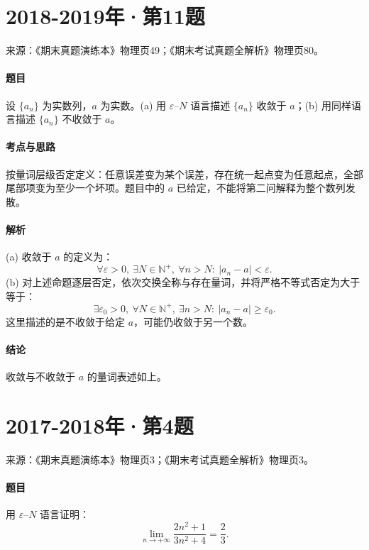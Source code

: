 \documentclass[UTF8,fontset=fandol,12pt,oneside,openany]{ctexrep}
\theoremstyle{definition}
\begin{document}
\par\addvspace{18pt}\noindent\begin{minipage}{\linewidth}
\section{2018-2019年·第11题}
\noindent 来源：《期末真题演练本》物理页49；《期末考试真题全解析》物理页80。

\paragraph{题目}
设 $\{a_n\}$ 为实数列，$a$ 为实数。(a) 用 $\varepsilon$–$N$ 语言描述 $\{a_n\}$ 收敛于 $a$；(b) 用同样语言描述 $\{a_n\}$ 不收敛于 $a$。
\end{minipage}\par
\paragraph{考点与思路}
按量词层级否定定义：任意误差变为某个误差，存在统一起点变为任意起点，全部尾部项变为至少一个坏项。题目中的 $a$ 已给定，不能将第二问解释为整个数列发散。

\paragraph{解析}
(a) 收敛于 $a$ 的定义为：
\[
\forall\varepsilon>0,\ \exists N\in\mathbb N^+,\ \forall n>N:\ |a_n-a|<\varepsilon.
\]
(b) 对上述命题逐层否定，依次交换全称与存在量词，并将严格不等式否定为大于等于：
\[
\exists\varepsilon_0>0,\ \forall N\in\mathbb N^+,\ \exists n>N:\ |a_n-a|\ge\varepsilon_0.
\]
这里描述的是不收敛于给定 $a$，可能仍收敛于另一个数。

\paragraph{结论}
收敛与不收敛于 $a$ 的量词表述如上。

\par\addvspace{18pt}\noindent\begin{minipage}{\linewidth}
\section{2017-2018年·第4题}
\noindent 来源：《期末真题演练本》物理页3；《期末考试真题全解析》物理页3。

\paragraph{题目}
用 $\varepsilon$–$N$ 语言证明：\[
\lim_{n\to+\infty}\frac{2n^2+1}{3n^2+4}=\frac23.
\]
\end{minipage}\par
\end{document}

